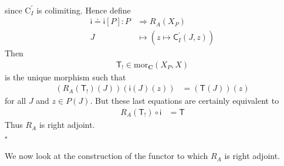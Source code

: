 \begin{prf}
\begin{align*}
\end{align*}
since $\mathrm{C}_{I}^{\prime}$ is colimiting.
Hence define
\begin{align*}
  \mathsf{i}
  \doteq
  \mathsf{i}[P]
  \colon
  P
  &\Rightarrow
  R_{A}(X_{P})
  \\
  J
  &\mapsto
  \left(
    z
    \mapsto
    \mathsf{C}_{I}^{\prime}(J,z)
  \right)
\end{align*}
Then
\begin{align*}
  \mathsf{T}_{!}
  \in
  \mathrm{mor}_{\mathbf{C}}(X_{P},X)
\end{align*}
is the unique morphism such that
\begin{align*}
  \left(
    R_{A}(\mathsf{T}_{!})(J)
  \right)
  \left(
    \mathsf{i}(J)(z)
  \right)
  &=
  (\mathsf{T}(J))(z)
\end{align*}
for all $J$ and $z \in P(J)$.
But these last equations are certainly equivalent to
\begin{align*}
  R_{A}(\mathsf{T}_{!})
  \circ
  \mathsf{i}
  &=
  \mathsf{T}
\end{align*}
Thus $R_{A}$ is right adjoint.
\\
\phantom{proven}
\hfill
$\square$
\end{prf}
We now look at the construction of the functor to which $R_{A}$ is right adjoint.
\\
